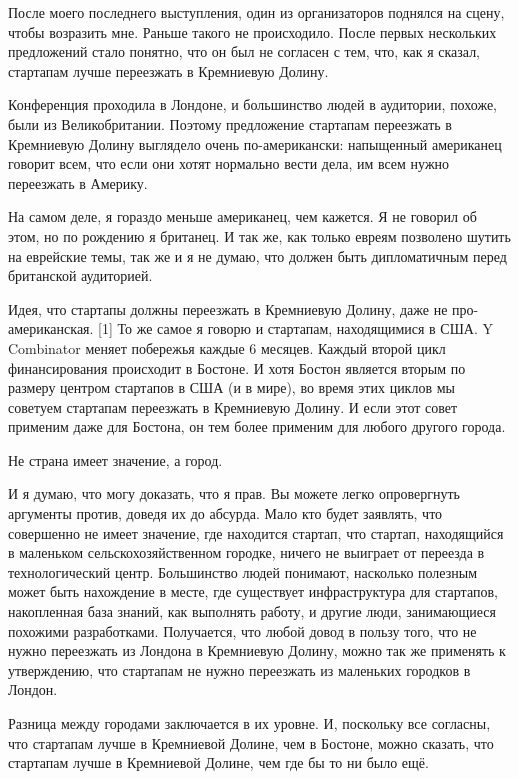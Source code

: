 \documentclass[ebook,12pt,oneside,openany]{memoir}
\date{}
\begin{document}
\maketitle

После моего последнего выступления, один из организаторов поднялся на
сцену, чтобы возразить мне. Раньше такого не происходило. После первых
нескольких предложений стало понятно, что он был не согласен с тем,
что, как я сказал, стартапам лучше переезжать в Кремниевую Долину.

Конференция проходила в Лондоне, и большинство людей в аудитории,
похоже, были из Великобритании. Поэтому предложение стартапам
переезжать в Кремниевую Долину выглядело очень по-американски:
напыщенный американец говорит всем, что если они хотят нормально вести
дела, им всем нужно переезжать в Америку.

На самом деле, я гораздо меньше американец, чем кажется. Я не говорил
об этом, но по рождению я британец. И так же, как только евреям
позволено шутить на еврейские темы, так же и я не думаю, что должен
быть дипломатичным перед британской аудиторией.

Идея, что стартапы должны переезжать в Кремниевую Долину, даже не
про-американская. [1] То же самое я говорю и стартапам, находящимися в
США. Y Combinator меняет побережья каждые 6 месяцев. Каждый второй
цикл финансирования происходит в Бостоне. И хотя Бостон является
вторым по размеру центром стартапов в США (и в мире), во время этих
циклов мы советуем стартапам переезжать в Кремниевую Долину. И если
этот совет применим даже для Бостона, он тем более применим для любого
другого города.

Не страна имеет значение, а город.

И я думаю, что могу доказать, что я прав. Вы можете легко опровергнуть
аргументы против, доведя их до абсурда. Мало кто будет заявлять, что
совершенно не имеет значение, где находится стартап, что стартап,
находящийся в маленьком сельскохозяйственном городке, ничего не
выиграет от переезда в технологический центр. Большинство людей
понимают, насколько полезным может быть нахождение в месте, где
существует инфраструктура для стартапов, накопленная база знаний, как
выполнять работу, и другие люди, занимающиеся похожими разработками.
Получается, что любой довод в пользу того, что не нужно переезжать из
Лондона в Кремниевую Долину, можно так же применять к утверждению, что
стартапам не нужно переезжать из маленьких городков в Лондон.

Разница между городами заключается в их уровне. И, поскольку все
согласны, что стартапам лучше в Кремниевой Долине, чем в Бостоне,
можно сказать, что стартапам лучше в Кремниевой Долине, чем где бы то
ни было ещё.
\end{document}
